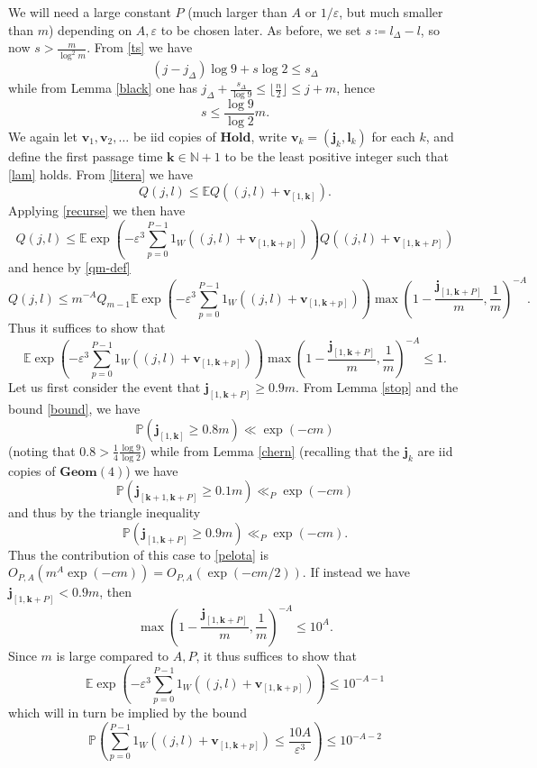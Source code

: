\documentclass[12pt,a4paper,reqno]{amsart}
\numberwithin{equation}{section}
\theoremstyle{plain}
\theoremstyle{definition}
\renewcommand\P{\mathbb{P}}
\newcommand\E{\mathbb{E}}
\newcommand\N{\mathbb{N}}
\renewcommand\j{\mathbf{j}}
\renewcommand\k{\mathbf{k}}
\renewcommand\v{\mathbf{v}}
\renewcommand\l{\mathbf{l}}
\newcommand\Geom{\mathbf{Geom}}
\newcommand\Hold{\mathbf{Hold}}
\newcommand\eps{\varepsilon}
\begin{document}
We will need a large constant $P$ (much larger than $A$ or $1/\eps$, but much smaller than $m$) depending on $A,\eps$ to be chosen later.  As before, we set $s \coloneqq l_\Delta - l$, so now $s > \frac{m}{\log^2 m}$.  From \eqref{ts} we have
$$ (j-j_\Delta) \log 9 + s \log 2 \leq s_\Delta$$
while from Lemma \ref{black} one has $j_\Delta + \frac{s_\Delta}{\log 9} \leq \lfloor \frac{n}{2} \rfloor \leq j+m$, hence
\begin{equation}\label{bound}
 s \leq \frac{\log 9}{\log 2} m.
\end{equation}
We again let $\v_1,\v_2,\dots$ be iid copies of $\Hold$, write $\v_k = (\j_k, \l_k)$ for each $k$, and define the first passage time $\k \in \N+1$ to be the least positive integer such that \eqref{lam} holds.  From \eqref{litera} we have
$$
 Q(j,l) \leq \E Q((j,l) + \v_{[1,\k]}).
$$
Applying \eqref{recurse} we then have
$$
 Q(j,l) \leq \E \exp\left( - \eps^3 \sum_{p=0}^{P-1} 1_W((j,l) + \v_{[1,\k+p]} ) \right) Q((j,l) + \v_{[1,\k+P]})
$$
and hence by \eqref{qm-def}
$$
 Q(j,l) \leq m^{-A} Q_{m-1} \E \exp\left( - \eps^3 \sum_{p=0}^{P-1} 1_W((j,l) + \v_{[1,\k+p]}) \right) \max\left( 1 - \frac{\j_{[1,\k+P]}}{m}, \frac{1}{m}\right)^{-A}.
$$
Thus it suffices to show that
\begin{equation}\label{pelota}
 \E \exp\left( - \eps^3 \sum_{p=0}^{P-1} 1_W((j,l) + \v_{[1,\k+p]} )\right) \max\left( 1 - \frac{\j_{[1,\k+P]}}{m}, \frac{1}{m}\right)^{-A} \leq 1.
\end{equation}
Let us first consider the event that $\j_{[1,\k+P]} \geq 0.9 m$.  From Lemma \ref{stop} and the bound \eqref{bound}, we have
$$ \P( \j_{[1,\k]} \geq 0.8 m ) \ll \exp( -c m)$$
(noting that $0.8 > \frac{1}{4} \frac{\log 9}{\log 2}$) while from Lemma \ref{chern} (recalling that the $\j_k$ are iid copies of $\Geom(4)$) we have
$$ \P( \j_{[\k+1,\k+P]} \geq 0.1m ) \ll_P \exp( -c m)$$
and thus by the triangle inequality
$$ \P( \j_{[1,\k+P]} \geq 0.9 m ) \ll_P \exp( -c m).$$
Thus the contribution of this case to \eqref{pelota} is $O_{P,A}(m^A \exp(-cm)) = O_{P,A}(\exp(-cm/2))$.  If instead we have $\j_{[1,\k+P]} < 0.9 m$, then
$$ \max\left( 1 - \frac{\j_{[1,\k+P]}}{m}, \frac{1}{m}\right)^{-A} \leq 10^A.$$
Since $m$ is large compared to $A,P$, it thus suffices to show that
$$
 \E \exp\left( - \eps^3 \sum_{p=0}^{P-1} 1_W((j,l) + \v_{[1,\k+p]} )\right) \leq 10^{-A-1}
$$
which will in turn be implied by the bound
\begin{equation}\label{cheap}
\P\left( \sum_{p=0}^{P-1} 1_W((j,l) + \v_{[1,\k+p]} ) \leq \frac{10 A}{\eps^3} \right) \leq 10^{-A-2}
\end{equation}
\end{document}

